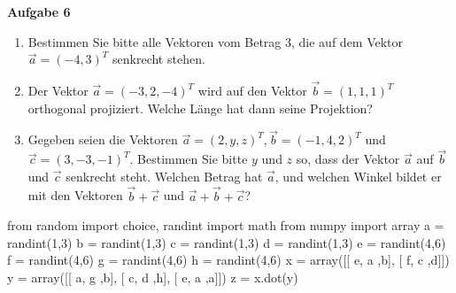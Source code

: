 \documentclass[a4paper,12pt]{article}
\newcommand{\Aufgabe}[1]{
	{
		\vspace*{0.5cm}
		\textsf{\textbf{Aufgabe #1}}
		\vspace*{0.2cm}
		
	}
}
\begin{document}
\Aufgabe{6}
\begin{enumerate}
	\item Bestimmen Sie bitte alle Vektoren vom Betrag 3, die auf dem Vektor $\vec{a} = (-4,3)^T$ senkrecht stehen.
	\item Der Vektor $\vec{a} = (-3,2,-4)^T$ wird auf den Vektor $\vec{b} = (1,1,1)^T$ orthogonal projiziert. Welche Länge hat dann seine Projektion? 
	\item Gegeben seien die Vektoren $\vec{a} = (2,y,z)^T, \vec{b} = (-1,4,2)^T$ und $\vec{c} = (3,-3,-1)^T$. Bestimmen Sie bitte $y$ und $z$ so, dass der Vektor $\vec{a}$ auf $\vec{b}$ und $\vec{c}$ senkrecht steht. Welchen Betrag hat $\vec{a}$, und welchen Winkel bildet er mit den Vektoren $\vec{b}+\vec{c}$ und $\vec{a}+\vec{b}+\vec{c}$?
\end{enumerate}

\begin{pycode}
from random import choice, randint
import math
from numpy import array
a = randint(1,3)
b = randint(1,3)
c = randint(1,3)
d = randint(1,3)
e = randint(4,6)
f = randint(4,6)
g = randint(4,6)
h = randint(4,6)
x = array([[ e, a ,b], [ f, c ,d]])
y = array([[ a, g ,b], [ c, d ,h], [ e, a ,a]])
z = x.dot(y)
\end{pycode}
\end{document}
